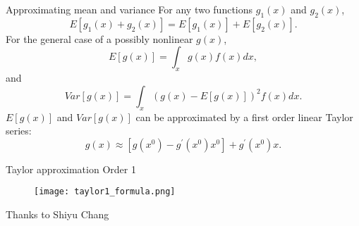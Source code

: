\documentclass[11pt,table]{beamer}
\begin{document}
\begin{frame}{Approximating mean and variance}
For any two functions $g_{1}(x)$ and $g_{2}(x)$,
 \begin{equation}
    E[g_{1}(x) + g_{2}(x)] = E[g_{1}(x)] + E[g_{2}(x)].
 \end{equation}
 For the general case of a possibly nonlinear $g(x)$,
 {\begin{equation}
    E[g(x)] =\int_{x}g(x)f(x)dx,
 \end{equation}
 and
 \begin{equation}
    Var[g(x)] =\int_{x}\left(g(x) - E [g(x)]\right)^{2}f(x)dx.
 \end{equation}}
$E[g(x)]$ and $Var[g(x)]$ can be approximated by a first order linear Taylor series:
\begin{equation}\label{eq5}
    g(x)\approx [g(x^{0})-g^{\prime}(x^{0})x^{0}]+g^{\prime}(x^{0})x.
\end{equation}
\end{frame}


\begin{frame}{Taylor approximation Order 1}
\begin{figure}
	\centering
		\texttt{[image: taylor1\_formula.png]}
	\label{fig:taylor1_formula}
\end{figure}
\tiny Thanks to Shiyu Chang
\end{frame}
\end{document}
